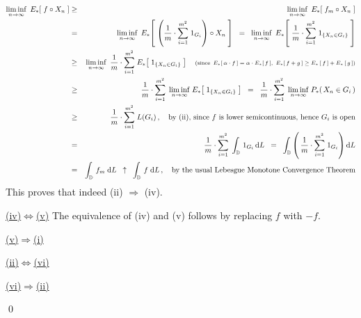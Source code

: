 \begin{eqnarray*}
\underset{n\rightarrow\infty}{\liminf}\;\,E_{*}\!\left[\;f \circ X_{n}\;\right]
&\geq&
	\underset{n\rightarrow\infty}{\liminf}\;\,E_{*}\!\left[\;f_{m} \circ X_{n}\;\right]
\\
&=&
	\underset{n\rightarrow\infty}{\liminf}\;\,
	E_{*}\!\left[\;
		\left(\dfrac{1}{m} \cdot \overset{m^{2}}{\underset{i=1}{\sum}} \; 1_{G_{i}}\right) \circ X_{n}
		\;\right]
\;\; = \;\;
	\underset{n\rightarrow\infty}{\liminf}\;\,
	E_{*}\!\left[\;
		\dfrac{1}{m} \cdot \overset{m^{2}}{\underset{i=1}{\sum}} \; 1_{\{X_{n} \in G_{i}\}}
		\;\right]
\\
&\geq&
	\underset{n\rightarrow\infty}{\liminf}\;\,
	\dfrac{1}{m} \cdot \overset{m^{2}}{\underset{i=1}{\sum}} \; E_{*}\!\left[\; 1_{\{X_{n} \in G_{i}\}} \;\right]
	\quad
	\textnormal{\scriptsize(since \,$E_{*}\!\left[\,\alpha\cdot f\,\right] = \alpha\cdot E_{*}\!\left[\,f\,\right]$,
	\,$E_{*}\!\left[\,f + g\,\right] \geq E_{*}\left[\,f\,\right] + E_{*}\left[\,g\,\right]$)}
\\
&\geq&
	\dfrac{1}{m} \cdot \overset{m^{2}}{\underset{i=1}{\sum}}\;\,
	\underset{n\rightarrow\infty}{\liminf}\;
	E_{*}\!\left[\; 1_{\{X_{n} \in G_{i}\}} \;\right]
\;\; = \;\;
	\dfrac{1}{m} \cdot \overset{m^{2}}{\underset{i=1}{\sum}}\;\,
	\underset{n\rightarrow\infty}{\liminf}\;
	P_{*}\!\left(\, X_{n} \in G_{i} \,\right)
\\
&\geq&
	\dfrac{1}{m} \cdot \overset{m^{2}}{\underset{i=1}{\sum}}\; L(G_{i})\,,
	\quad
	\textnormal{by (ii), since $f$ is lower semicontinuous, hence $G_{i}$ is open}
\\
&=&
	\dfrac{1}{m} \cdot \overset{m^{2}}{\underset{i=1}{\sum}}\; \int_{\D}\, 1_{G_{i}} \,\d L
\;\; = \;\;
	\int_{\D} \left(\,\dfrac{1}{m} \cdot \overset{m^{2}}{\underset{i=1}{\sum}}\; 1_{G_{i}} \right) \d L
\\
&=&
	\int_{\D}\, f_{m} \;\d L
	\;\; \uparrow \;\;
	\int_{\D}\, f \;\d L\,,
	\quad
	\textnormal{by the usual Lebesgue Monotone Convergence Theorem}
\end{eqnarray*}
This proves that indeed (ii) $\Longrightarrow$ (iv).

\vskip 0.5cm \noindent
\underline{(iv)\;$\Longleftrightarrow$\;(v)}
\vskip 0.2cm \noindent
The equivalence of (iv) and (v) follows by replacing $f$ with $-f$.

\vskip 0.5cm \noindent
\underline{(v)\;$\Longrightarrow$\;(i)}
\vskip 0.2cm \noindent

\vskip 0.5cm \noindent
\underline{(ii)\;$\Longleftrightarrow$\;(vi)}
\vskip 0.2cm \noindent

\vskip 0.5cm \noindent
\underline{(vi)\;$\Longrightarrow$\;(ii)}
\vskip 0.2cm \noindent

\qed



\renewcommand{\theenumi}{\roman{enumi}}
\renewcommand{\labelenumi}{\textnormal{(\theenumi)}$\;\;$}

